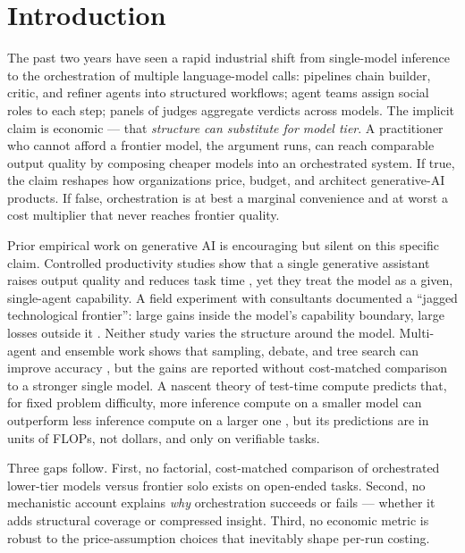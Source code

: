 \documentclass[12pt,a4paper]{article}
\begin{document}
\section{Introduction}\label{sec:intro}

The past two years have seen a rapid industrial shift from single-model
inference to the orchestration of multiple language-model calls: pipelines
chain builder, critic, and refiner agents into structured workflows; agent
teams assign social roles to each step; panels of judges aggregate verdicts
across models. The implicit claim is economic --- that \emph{structure can
substitute for model tier}. A practitioner who cannot afford a frontier model,
the argument runs, can reach comparable output quality by composing cheaper
models into an orchestrated system. If true, the claim reshapes how
organizations price, budget, and architect generative-AI products. If false,
orchestration is at best a marginal convenience and at worst a cost multiplier
that never reaches frontier quality.

Prior empirical work on generative AI is encouraging but silent on this
specific claim. Controlled productivity studies show that a single generative
assistant raises output quality and reduces task time \citep{NoyZhang2023,
BrynjolfssonLiRaymond2023}, yet they treat the model as a given, single-agent
capability. A field experiment with consultants documented a ``jagged
technological frontier'': large gains inside the model's capability boundary,
large losses outside it \citep{DellAcquaEtAl2023}. Neither study varies the
structure around the model. Multi-agent and ensemble work shows that sampling,
debate, and tree search can improve accuracy \citep{WangEtAl2023,
LiangEtAl2024, YaoEtAl2023}, but the gains are reported without cost-matched
comparison to a stronger single model. A nascent theory of test-time compute
predicts that, for fixed problem difficulty, more inference compute on a
smaller model can outperform less inference compute on a larger one
\citep{SnellEtAl2024}, but its predictions are in units of FLOPs, not dollars,
and only on verifiable tasks.

Three gaps follow. First, no factorial, cost-matched comparison of orchestrated
lower-tier models versus frontier solo exists on open-ended tasks. Second, no
mechanistic account explains \emph{why} orchestration succeeds or fails ---
whether it adds structural coverage or compressed insight. Third, no economic
metric is robust to the price-assumption choices that inevitably shape per-run
costing.
\end{document}
